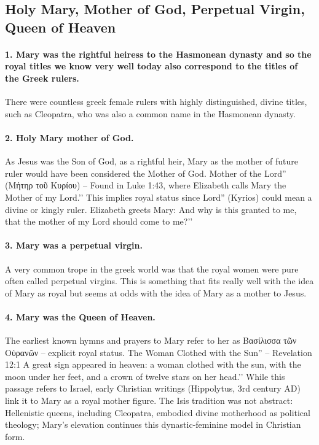 \subsection{Holy Mary, Mother of God, Perpetual Virgin, Queen of Heaven}\label{subsec:holy-mary-mother-of-god-perpetual-virgin-queen-of-heaven}
\paragraph{1.
Mary was the rightful heiress to the Hasmonean dynasty and so the royal titles we know very well today also correspond to the titles of the Greek rulers.}\label{par:mary-was-the-rightful-heiress-to-the-hasmonean-dynasty-and-so-the-royal-titles-we-know-very-well-today-also-correspond-to-the-titles-of-the-greek-rulers.}
There were countless greek female rulers with highly distinguished, divine titles, such as Cleopatra, who was also a common name in the Hasmonean dynasty.
\paragraph{2.
Holy Mary mother of God.}\label{par:holy-mary-mother-of-god.}
As Jesus was the Son of God, as a rightful heir, Mary as the mother of future ruler would have been considered the Mother of God.
Mother of the Lord'' (Μήτηρ τοῦ Κυρίου) -- Found in Luke 1:43, where Elizabeth calls Mary the Mother of my Lord.’’ This implies royal status since Lord'' (Kyrios) could mean a divine or kingly ruler. Elizabeth greets Mary: And why is this granted to me, that the mother of my Lord should come to me?’’
\paragraph{3.
Mary was a perpetual virgin.}\label{par:mary-was-a-perpetual-virgin.}
A very common trope in the greek world was that the royal women were pure often called perpetual virgins.
This is something that fits really well with the idea of Mary as royal but seems at odds with the idea of Mary as a mother to Jesus.
\paragraph{4.
Mary was the Queen of Heaven.}\label{par:mary-was-the-queen-of-heaven.}
The earliest known hymns and prayers to Mary refer to her as Βασίλισσα τῶν Οὐρανῶν – explicit royal status.
The Woman Clothed with the Sun'' -- Revelation 12:1 A great sign appeared in heaven: a woman clothed with the sun, with the moon under her feet, and a crown of twelve stars on her head.’’ While this passage refers to Israel, early Christian writings (Hippolytus, 3rd century AD) link it to Mary as a royal mother figure. The Isis tradition was not abstract: Hellenistic queens, including Cleopatra, embodied divine motherhood as political theology; Mary’s elevation continues this dynastic-feminine model in Christian form.
